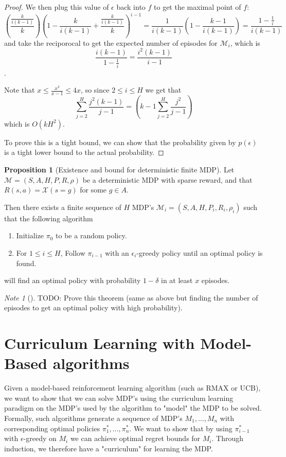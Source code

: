 \documentclass[12pt, letterpaper]{article}
\theoremstyle{definition}
\newtheorem*{prop}{Proposition}
\theoremstyle{remark}
\newtheorem*{note}{Note}
\begin{document}
\begin{proof}[Proof]
    We then plug this value of \(\epsilon\) back into \(f\) to get the maximal point of \(f\):
    \[(\frac{\frac{k}{i(k-1)}}{k})(1 - \frac{k}{i(k-1)} + \frac{\frac{k}{i(k-1)}}{k})^{i-1} = \frac{1}{i(k-1)}(1 - \frac{k-1}{i(k-1)}) = \frac{1 - \frac{1}{i}}{i(k-1)}\]
    and take the reciporocal to get the expected number of episodes for \(\mathcal{M}_i\), which is
    \[\frac{i(k-1)}{1 - \frac{1}{i}} = \frac{i^2(k-1)}{i-1}\].

    Note that \(x \leq \frac{x^2}{x-1} \leq 4x\), so since \(2 \leq i \leq H\) we get that
    \[\sum_{j = 2}^H \frac{j^2 (k-1)}{j-1} = (k-1 \sum_{j=2}^H \frac{j^2}{j-1})\]
    which is \(O(kH^2)\).

    To prove this is a tight bound, we can show that the probability given by \(p(\epsilon)\) is a tight lower bound to the actual probability.
\end{proof}

\begin{prop}[Existence and bound for deterministic finite MDP]
    Let \(\mathcal{M} = (S, A, H, P, R, \rho)\) be a deterministic MDP with sparse reward, and that \(R(s, a) = \mathcal{X}(s = g)\) for some \(g \in A\).
    
    Then there exists a finite sequence of $H$ MDP's \(\mathcal{M}_i = (S, A, H, P_i, R_i, \rho_i)\) such that the following algorithm

    \begin{enumerate}
        \item Initialize \(\pi_0\) to be a random policy.
        \item For \(1 \leq i \leq H\), Follow \(\pi_{i-1}\) with an \(\epsilon_i\)-greedy policy until an optimal policy is found.
    \end{enumerate}

    will find an optimal policy with probability \(1 - \delta\) in at least \(x\) episodes.
\end{prop}

\begin{note}[]
    \color{red}
    TODO: Prove this theorem (same as above but finding the number of episodes to get an optimal policy with high probability).
\end{note}

\section{Curriculum Learning with Model-Based algorithms}

Given a model-based reinforcement learning algorithm (such as RMAX or UCB), we want to show that we can solve MDP's using the curriculum learning paradigm on the MDP's used by the algorithm to "model" the MDP to be solved. Formally, such algorithms generate a sequence of MDP's \(M_1, \ldots, M_n\) with corresponding optimal policies \(\pi^*_1, \ldots, \pi^*_n\). We want to show that by using \(\pi^*_{i-1}\) with \(\epsilon\)-greedy on \(M_i\) we can achieve optimal regret bounds for \(M_i\). Through induction, we therefore have a "curriculum" for learning the MDP.
\end{document}
